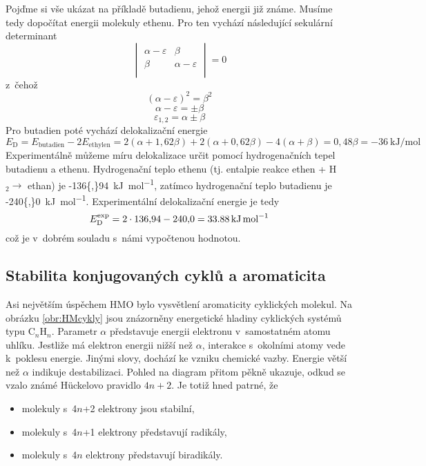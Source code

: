 Pojďme si vše ukázat na příkladě butadienu, jehož energii již známe. Musíme tedy dopočítat energii molekuly ethenu. Pro ten vychází následující sekulární determinant 
\begin{equation}
\begin{vmatrix}
\alpha - \varepsilon & \beta \\
\beta & \alpha - \varepsilon \\
\end{vmatrix}
=0
\end{equation}
z~čehož
$$
(\alpha-\varepsilon)^2=\beta^2
$$
$$
\alpha - \varepsilon = \pm \beta
$$
$$
\varepsilon_{1,2}= \alpha\pm \beta 
$$
Pro butadien poté vychází delokalizační energie
\begin{equation}
E_{\mathrm{D}} = E_{\mathrm{butadien}} - 2E_{\mathrm{ethylen}}=2(\alpha + 1{,}62\beta)+ 2(\alpha + 0{,}62\beta) - 4(\alpha + \beta) =0{,}48\beta = -\SI{36}{\kJ\per\mol}
\end{equation}
%
Experimentálně můžeme míru delokalizace určit pomocí hydrogenačních tepel butadienu a ethenu.
Hydrogenační teplo ethenu (tj. entalpie reakce ethen + H$_2 \xrightarrow{}$ ethan) je
\SI{-136{,}94}{\kJ\per\mol}, zatímco hydrogenační teplo butadienu je \SI{-240{,}0}{\kJ\per\mol}. Experimentální delokalizační energie je tedy
\begin{equation}
E_{\mathrm{D}}^{\mathrm{exp}}=2\cdot136{,}94-240{,}0 = \SI{33{,}88}{\kJ\per\mol}
\end{equation}
\noindent což je v~dobrém souladu s~námi vypočtenou hodnotou.

\subsection{Stabilita konjugovaných cyklů  a aromaticita}

Asi největším úspěchem HMO bylo vysvětlení aromaticity cyklických molekul. Na obrázku \ref{obr:HMcykly} jsou znázorněny energetické hladiny cyklických systémů typu C$_n$H$_n$. Parametr $\alpha$ představuje energii elektronu v~samostatném atomu uhlíku. Jestliže má elektron energii nižší než  $\alpha$, interakce s~okolními atomy vede k~poklesu energie. Jinými slovy, dochází ke vzniku chemické vazby. Energie větší než $\alpha$ indikuje destabilizaci. Pohled na diagram přitom pěkně ukazuje, odkud se vzalo známé  H\"{u}ckelovo pravidlo $4n+2$. Je totiž hned patrné, že

\begin{itemize}
\item molekuly s~4$n$+2 elektrony jsou stabilní,
\item molekuly s~4$n$+1 elektrony představují radikály,
\item molekuly s~4$n$ elektrony představují biradikály.
\end{itemize}



